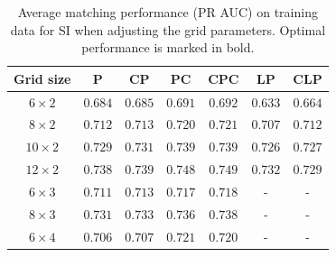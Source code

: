 \documentclass[thesis.tex]{subfiles}
\begin{document}
%
\begin{table}[tb]
\centering
\begin{tabular}{ c c c c c c c }
\toprule
Grid size & P & CP & PC & CPC & LP & CLP \\ \midrule
$6 \times 2$ & $0.684$ & $0.685$ & $0.691$ & $0.692$ & $0.633$ & $0.664$ \\ 
$8 \times 2$ & $0.712$ & $0.713$ & $0.720$ & $0.721$ & $0.707$ & $0.712$ \\ 
$10 \times 2$ & $0.729$ & $0.731$ & $0.739$ & $0.739$ & $0.726$ & $0.727$ \\ 
$12 \times 2$ & $0.738$ & $0.739$ & $0.748$ & $\mathbf{0.749}$ & $0.732$ & $0.729$ \\ 
$6 \times 3$ & $0.711$ & $0.713$ & $0.717$ & $0.718$ & - & - \\ 
$8 \times 3$ & $0.731$ & $0.733$ & $0.736$ & $0.738$ & - & - \\ 
$6 \times 4$ & $0.706$ & $0.707$ & $0.721$ & $0.720$ & - & - \\
\bottomrule
\end{tabular}
\caption{Average matching performance (PR AUC) on training data for SI when adjusting the grid parameters. Optimal performance is marked in bold.}
\label{tbl:dtuLayoutParametersSi}
\end{table}
%
\end{document}
